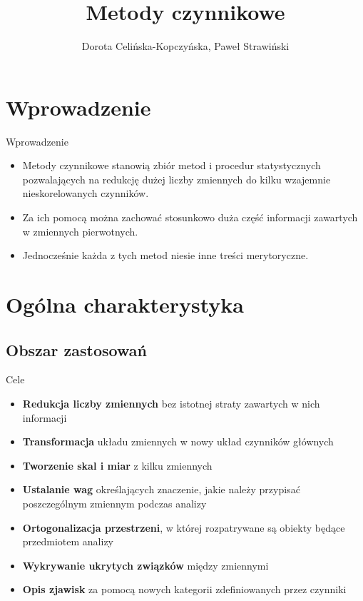 \documentclass{beamer}
\begin{document}
\begin{frame}
\title[Tytuł]{Metody czynnikowe}

\author{Dorota Celińska-Kopczyńska, Paweł Strawiński}

\titlepage
\end{frame}
\begin{frame}[allowframebreaks]
  \tableofcontents
\end{frame}

\section{Wprowadzenie}
\begin{frame}{Wprowadzenie}
  \begin{itemize}
  \item Metody czynnikowe stanowią zbiór metod i procedur statystycznych pozwalających na redukcję dużej liczby zmiennych do kilku wzajemnie nieskorelowanych czynników.
  \item Za ich pomocą można zachować stosunkowo duża część informacji zawartych w zmiennych pierwotnych.
  \item Jednocześnie każda z tych metod niesie inne treści merytoryczne.
  \end{itemize}
\end{frame}

\section{Ogólna charakterystyka}
\subsection{Obszar zastosowań}
\begin{frame}{Cele}
  \begin{itemize}
  \item \textbf{Redukcja liczby zmiennych} bez istotnej straty zawartych w nich informacji
  \item \textbf{Transformacja} układu zmiennych w nowy układ czynników głównych
  \item \textbf{Tworzenie skal i miar} z kilku zmiennych
  \item \textbf{Ustalanie wag} określających znaczenie, jakie należy przypisać poszczególnym zmiennym podczas analizy
  \item \textbf{Ortogonalizacja przestrzeni}, w której rozpatrywane są obiekty będące przedmiotem analizy
  \item \textbf{Wykrywanie ukrytych związków} między zmiennymi
  \item \textbf{Opis zjawisk} za pomocą nowych kategorii zdefiniowanych przez czynniki
  \end{itemize}
\end{frame}
\end{document}
